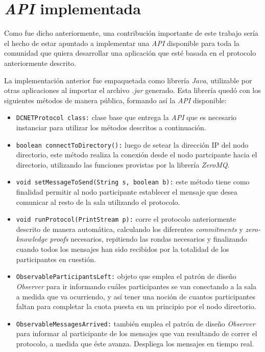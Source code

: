 \section{\emph{API} implementada}

Como fue dicho anteriormente, una contribución importante de este trabajo 
sería el hecho de estar apuntado a implementar una \emph{API} disponible para 
toda la comunidad que quiera desarrollar una aplicación que esté basada en el 
protocolo anteriormente descrito. 

La implementación anterior fue empaquetada como librería \emph{Java}, 
utilizable por otras aplicaciones al importar el archivo \emph{.jar} generado. 
Esta librería quedó con los siguientes métodos de manera pública, formando así 
la \emph{API} disponible:

\begin{itemize}
    \item \texttt{DCNETProtocol class:} clase base que entrega la \emph{API} 
    que es necesario instanciar para utilizar los métodos descritos a 
    continuación. 
    \item \texttt{boolean connectToDirectory():} luego de setear la dirección 
    IP del nodo directorio, este método realiza la conexión desde el nodo partcipante
    hacia el directorio, utilizando las funciones provistas por la librería 
    \emph{ZeroMQ}.
    \item \texttt{void setMessageToSend(String s, boolean b):} este método tiene 
    como finalidad permitir al nodo participante establecer el mensaje que desea 
    comunicar al resto de la sala utilizando el protocolo. 
    \item \texttt{void runProtocol(PrintStream p):} corre el protocolo anteriormente 
    descrito de manera automática, calculando los diferentes \emph{commitments} y 
    \emph{zero-knowledge proofs} necesarios, repitiendo las rondas necesarios 
    y finalizando cuando todos los mensajes han sido recibidos por la totalidad 
    de los participantes en cuestión.
    \item \texttt{ObservableParticipantsLeft:} objeto que emplea el patrón de diseño 
    \emph{Observer} para ir informando cuáles participantes se van conectando a la sala 
    a medida que va ocurriendo, y así tener una noción de cuantos participantes faltan 
    para completar la cuota puesta en un principio por el nodo directorio.
    \item \texttt{ObservableMessagesArrived:} también emplea el patrón de diseño 
    \emph{Observer} para informar al participante de los mensajes que van resultando 
    de correr el protocolo, a medida que éste avanza. Despliega los mensajes en tiempo 
    real.
\end{itemize}

